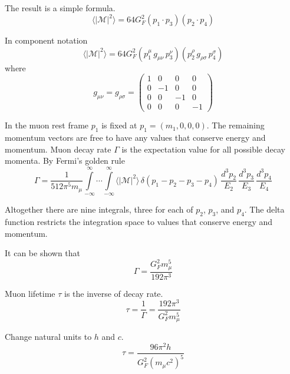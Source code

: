 The result is a simple formula.
\begin{equation*}
\langle|\mathcal{M}|^2\rangle=64G_F^2(p_1\cdot p_3)(p_2\cdot p_4)
\end{equation*}

In component notation
\begin{equation*}
\langle|\mathcal{M}|^2\rangle=64G_F^2
(p_1^\mu \, g_{\mu\nu} \, p_3^\nu)
(p_2^\rho \, g_{\rho\sigma} \, p_4^\sigma)
\end{equation*}
where
\begin{equation*}
g_{\mu\nu}=g_{\rho\sigma}=\begin{pmatrix}
1 & 0 & 0 & 0\\
0 & -1 & 0 & 0\\
0 & 0 & -1 & 0\\
0 & 0 & 0 & -1
\end{pmatrix}
\end{equation*}

In the muon rest frame $p_1$ is fixed at $p_1=(m_1,0,0,0)$.
The remaining momentum vectors are free to have any values that conserve energy and momentum.
Muon decay rate $\Gamma$ is the expectation value for all possible decay momenta.
By Fermi's golden rule
\begin{equation*}
\Gamma=\frac{1}{512\pi^5m_\mu}
\int\limits_{-\infty}^\infty \cdots \int\limits_{-\infty}^\infty
\langle|\mathcal{M}|^2\rangle
\,\delta(p_1-p_2-p_3-p_4)
\,\frac{d^3p_2}{E_2}\,\frac{d^3p_3}{E_3}\,\frac{d^3p_4}{E_4}
\end{equation*}

Altogether there are nine integrals, three for each of $p_2$, $p_3$, and $p_4$.
The delta function restricts the integration space to values that conserve energy and momentum.

\bigskip
It can be shown that
\begin{equation*}
\Gamma=\frac{G_F^2 m_\mu^5}{192\pi^3}
\end{equation*}

Muon lifetime $\tau$ is the inverse of decay rate.
\begin{equation*}
\tau=\frac{1}{\Gamma}=\frac{192\pi^3}{G_F^2 m_\mu^5}
\end{equation*}

Change natural units to $h$ and $c$.
\begin{equation*}
\tau=\frac{96\pi^2h}{G_F^2\left(m_\mu c^2\right)^5}
\end{equation*}


